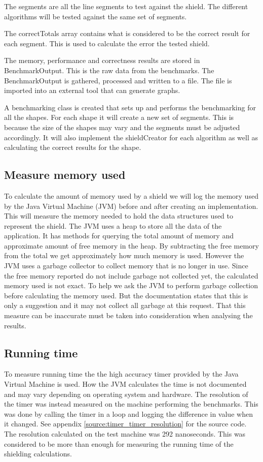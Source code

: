 \documentclass[11pt,twoside,a4paper]{report}
\begin{document}
The segments are all the line segments to test against the shield. The different algorithms will be tested against the same set of segments.

The correctTotals array contains what is considered to be the correct result for each segment. This is used to calculate the error the tested shield.

The memory, performance and correctness results are stored in BenchmarkOutput. This is the raw data from the benchmarks. The BenchmarkOutput is gathered, processed and written to a file. The file is imported into an external tool that can generate graphs.

A benchmarking class is created that sets up and performs the benchmarking for all the shapes. For each shape it will create a new set of segments. This is because the size of the shapes may vary and the segments must be adjusted accordingly. It will also implement the shieldCreator for each algorithm as well as calculating the correct results for the shape. 

\subsection{Measure memory used}
To calculate the amount of memory used by a shield we will log the memory used by the Java Virtual Machine (JVM) before and after creating an implementation. This will measure the memory needed to hold the data structures used to represent the shield. The JVM uses a heap to store all the data of the application. It has methods for querying the total amount of memory and approximate amount of free memory in the heap. By subtracting the free memory from the total we get approximately how much memory is used. However the JVM uses a garbage collector to collect memory that is no longer in use. Since the free memory reported do not include garbage not collected yet, the calculated memory used is not exact. To help we ask the JVM to perform garbage collection before calculating the memory used. But the documentation states that this is only a suggestion and it may not collect all garbage at this request. That this measure can be inaccurate must be taken into consideration when analysing the results. 

\subsection{Running time}
To measure running time the the high accuracy timer provided by the Java Virtual Machine is used. How the JVM calculates the time is not documented and may vary depending on operating system and hardware. The resolution of the timer was instead measured on the machine performing the benchmarks. This was done by calling the timer in a loop and logging the difference in value when it changed. See appendix \ref{source:timer_timer_resolution} for the source code. The resolution calculated on the test machine was 292 nanoseconds. This was considered to be more than enough for measuring the running time of the shielding calculations.
\end{document}
